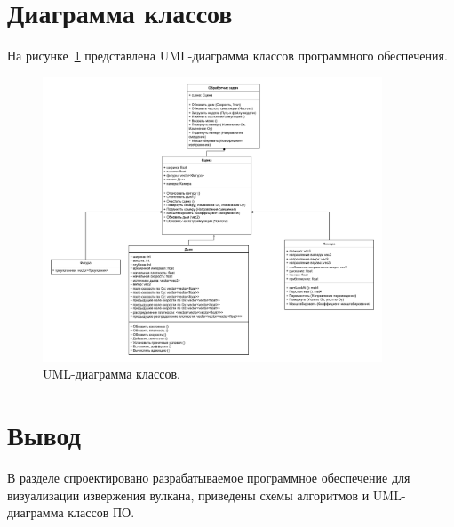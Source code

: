 \section{Диаграмма классов}

На рисунке~\ref{fig:uml} представлена UML-диаграмма классов программного обеспечения.

\begin{figure}[H]
	\centering
	\includegraphics[width=0.9\textwidth,page=1]{assets/img/smoke_uml.pdf}
	\caption{UML-диаграмма классов.}
	\label{fig:uml}
\end{figure}

\section*{Вывод}
В разделе спроектировано разрабатываемое программное обеспечение для визуализации извержения вулкана, приведены схемы алгоритмов и UML-диаграмма классов ПО.

